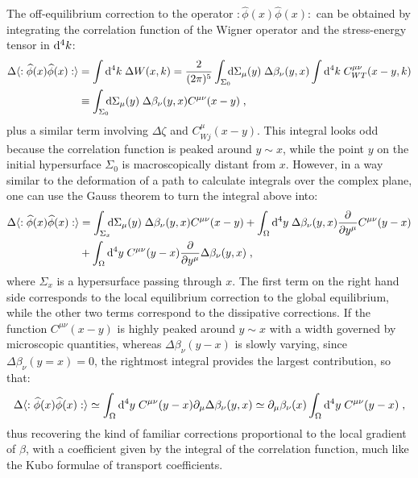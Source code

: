 \documentclass[prd,superscriptaddress,nofootinbib,notitlepage]{revtex4-1}
\def\wphi{\widehat \phi}
\newcommand{\di}{{\rm d}}
\begin{document}
The off-equilibrium correction to the operator $:\wphi(x)\wphi(x):$ can be obtained by integrating the
correlation function of the Wigner operator and the stress-energy tensor in $\di^4 k$:
%
\begin{align*}
 \Delta \langle :\wphi(x)\wphi(x): \rangle &= \int \di^4 k \; \Delta W(x,k) = \frac{2}{(2\pi)^5} 
\int_{\Sigma_0} \!\!\! \di \Sigma_{\mu}(y) \; \Delta \beta_\nu(y,x) \int \di^4 k \; C^{\mu\nu}_{WT}(x-y,k) \nonumber \\
& \equiv \int_{\Sigma_0} \!\!\! \di \Sigma_{\mu}(y) \; \Delta \beta_\nu(y,x) C^{\mu\nu}(x-y)\;,
\end{align*}
%
plus a similar term involving $\Delta \zeta$ and $C^\mu_{Wj}(x-y)$.
This integral looks odd because the correlation function is peaked around $y\sim x$, while the point $y$ on the initial 
hypersurface $\Sigma_0$ is macroscopically distant from $x$. However, in a way similar to the deformation of a path
to calculate integrals over the complex plane, one can use the Gauss theorem to turn the integral above into:
%
\begin{align*}
 \Delta \langle :\wphi(x)\wphi(x): \rangle &= \int_{\Sigma_x} \!\!\! \di \Sigma_{\mu}(y) \; \Delta \beta_\nu(y,x) 
 C^{\mu\nu}(x-y) + \int_\Omega \di^4 y \; \Delta \beta_\nu(y,x) \frac{\partial}{\partial y^\mu} C^{\mu\nu}(y-x) \\
&+ \int_\Omega \di^4 y \;  C^{\mu\nu}(y-x) \frac{\partial}{\partial y^\mu}\Delta \beta_\nu(y,x)\;,
\end{align*}
%
where $\Sigma_x$ is a hypersurface passing through $x$. The first term on the right hand side corresponds to the 
local equilibrium correction to the global equilibrium, while the other two terms correspond to the dissipative
corrections. If the function $C^{\mu\nu}(x-y)$ is highly peaked 
around $y \sim x$ with a width governed by microscopic quantities, whereas $\Delta \beta_\nu(y-x)$ is slowly
varying, since $\Delta \beta_\nu (y=x) = 0$, the rightmost integral provides the largest contribution, so that:
%
$$
 \Delta \langle :\wphi(x)\wphi(x): \rangle \simeq \int_\Omega \di^4 y \;  C^{\mu\nu}(y-x) \partial_\mu \Delta \beta_\nu(y,x)
  \simeq \partial_\mu \beta_\nu(x) \int_\Omega \di^4 y \;  C^{\mu\nu}(y-x)\;,
$$
%
thus recovering the kind of familiar corrections proportional to the local gradient of $\beta$, with a coefficient given by 
the integral of the correlation function, much like the Kubo formulae of transport coefficients. 

\end{document}
